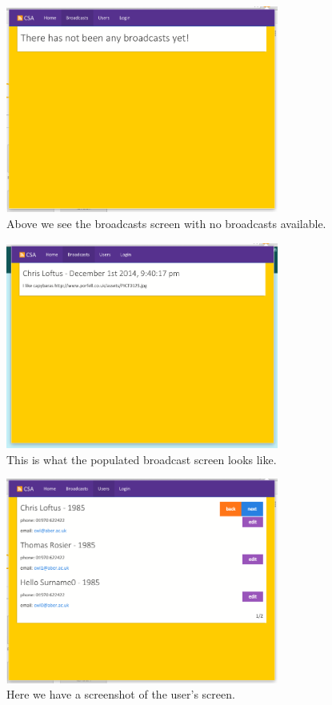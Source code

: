 \documentclass{article}
\begin{document}
\begin{figure}[!htbp]
\centering
\includegraphics[width=0.8\textwidth]{bcpage}
\caption{Above we see the broadcasts screen with no broadcasts available.}
\end{figure}

\begin{figure}[!htbp]
\centering
\includegraphics[width=0.8\textwidth]{populatebcpage}
\caption{This is what the populated broadcast screen looks like.}
\end{figure}

\begin{figure}[!htbp]
\centering
\includegraphics[width=0.8\textwidth]{userpage}
\caption{Here we have a screenshot of the user's screen.}
\end{figure}
\end{document}
